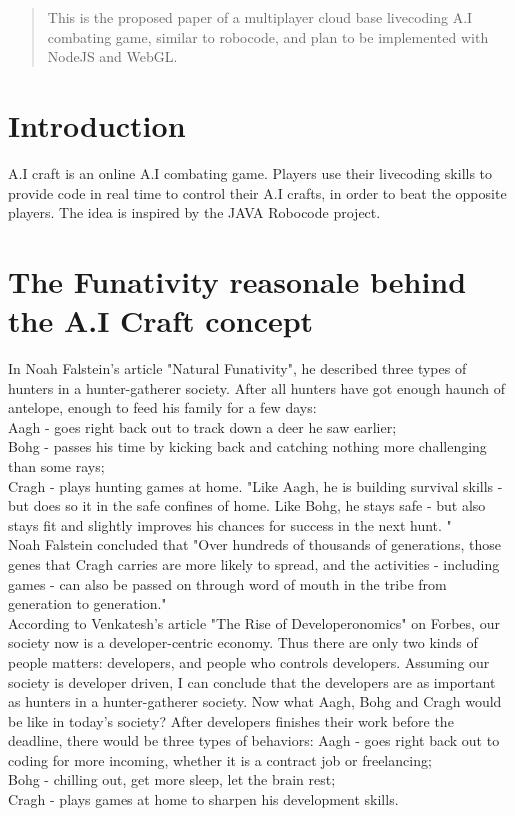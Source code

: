 \documentclass[12pt]{article}
\begin{document}
\maketitle

\begin{abstract}
This is the proposed paper of a multiplayer cloud base livecoding A.I combating game, similar to robocode, and plan to be implemented with NodeJS and WebGL.
\end{abstract}

\section{Introduction}
A.I craft is an online A.I combating game. Players use their livecoding skills to provide code in real time to control their A.I crafts, in order to beat the opposite players. The idea is inspired by the JAVA Robocode\cite{robocode01} project.

\section{The Funativity reasonale behind the A.I Craft concept}
In Noah Falstein's article "Natural Funativity"\cite{noah2004}, he described three types of hunters in a hunter-gatherer society. After all hunters have got enough haunch of antelope, enough to feed his family for a few days:\\
Aagh - goes right back out to track down a deer he saw earlier;\\
Bohg - passes his time by kicking back and catching nothing more challenging than some rays;\\
Cragh - plays hunting games at home. "Like Aagh, he is building survival skills - but does so it in the safe confines of home. Like Bohg, he stays safe - but also stays fit and slightly improves his chances for success in the next hunt. "\\
Noah Falstein concluded that "Over hundreds of thousands of generations, those genes that Cragh carries are more likely to spread, and the activities - including games - can also be passed on through word of mouth in the tribe from generation to generation."\\

According to Venkatesh's article "The Rise of Developeronomics"\cite{venkatesh2011} on Forbes, our society now is a developer-centric economy. Thus there are only two kinds of people matters: developers, and people who controls developers. Assuming our society is developer driven, I can conclude that the developers are as important as hunters in a hunter-gatherer society. Now what Aagh, Bohg and Cragh would be like in today's society? After developers finishes their work before the deadline, there would be three types of behaviors:
Aagh - goes right back out to coding for more incoming, whether it is a contract job or freelancing;\\
Bohg - chilling out, get more sleep, let the brain rest;\\
Cragh - plays games at home to sharpen his development skills.\\ 
\end{document}
